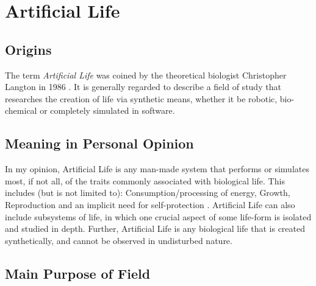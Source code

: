 \documentclass[10pt,a4paper]{article}
\begin{document}
		\pagebreak \section{Artificial Life}

			\subsection{Origins}

				The term \textsl{Artificial Life} was coined by the theoretical
				biologist Christopher Langton in 1986 \cite{artlife}. It is generally
				regarded to describe a field of study that researches the creation of
				life via synthetic means, whether it be robotic, bio-chemical or
				completely simulated in software.

			\subsection{Meaning in Personal Opinion}

				In my opinion, Artificial Life is any man-made system that performs or
				simulates most, if not all, of the traits commonly associated with
				biological life. This includes (but is not limited to):
				Consumption/processing of energy, Growth, Reproduction and an implicit
				need for self-protection \cite{cfl}. Artificial Life can also include
				subsystems of life, in which one crucial aspect of some life-form is
				isolated and studied in depth. Further, Artificial Life is any
				biological life that is created synthetically, and cannot be observed in
				undisturbed nature.

			\subsection{Main Purpose of Field}
\end{document}
